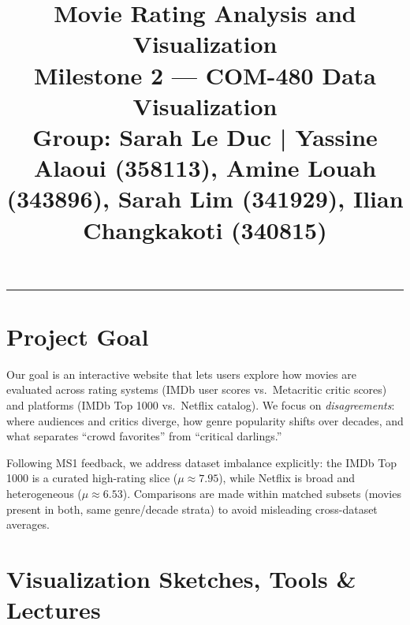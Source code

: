 \documentclass[a4paper,10pt]{article}
\title{\vspace{-1.5cm}\textbf{Movie Rating Analysis and Visualization}\\
\large Milestone 2 --- COM-480 Data Visualization\\[2pt]
\normalsize Group: Sarah Le Duc \quad|\quad
Yassine Alaoui (358113), Amine Louah (343896), Sarah Lim (341929), Ilian Changkakoti (340815)}
\date{}
\begin{document}
\maketitle
\vspace{-0.8cm}
\hrule
\vspace{0.3cm}

\section{Project Goal}

Our goal is an interactive website that lets users explore how movies are evaluated
across rating systems (IMDb user scores vs.\ Metacritic critic scores) and platforms
(IMDb Top 1000 vs.\ Netflix catalog). We focus on \emph{disagreements}: where
audiences and critics diverge, how genre popularity shifts over decades, and what
separates ``crowd favorites'' from ``critical darlings.''

Following MS1 feedback, we address dataset imbalance explicitly: the IMDb Top
1000 is a curated high-rating slice ($\mu \approx 7.95$), while Netflix is broad
and heterogeneous ($\mu \approx 6.53$). Comparisons are made within matched
subsets (movies present in both, same genre/decade strata) to avoid misleading
cross-dataset averages.

\section{Visualization Sketches, Tools \& Lectures}
\end{document}

